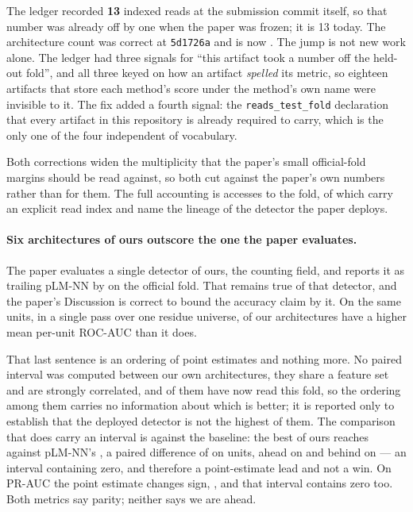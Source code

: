 The ledger recorded \textbf{13} indexed reads at the submission commit itself,
so that number was already off by one when the paper was frozen; it is 13 today.
The architecture count was correct at \texttt{5d1726a} and is now
\NArchOnFold{}. The jump is not new work alone. The ledger had three signals for
``this artifact took a number off the held-out fold'', and all three keyed on
how an artifact \emph{spelled} its metric, so eighteen artifacts that store each
method's score under the method's own name were invisible to it. The fix added a
fourth signal: the \texttt{reads\_test\_fold} declaration that every artifact in
this repository is already required to carry, which is the only one of the four
independent of vocabulary.

Both corrections widen the multiplicity that the paper's small official-fold
margins should be read against, so both cut against the paper's own numbers
rather than for them. The full accounting is \NFoldAccesses{} accesses to the
fold, of which \NIndexedReads{} carry an explicit read index and
\NLineageReads{} name the lineage of the detector the paper deploys.

\paragraph{Six architectures of ours outscore the one the paper evaluates.}
The paper evaluates a single detector of ours, the counting field, and reports
it as trailing pLM-NN by \PlmAucDelta{} \PlmAucCI{} on the official fold. That
remains true of that detector, and the paper's Discussion is correct to bound
the accuracy claim by it. On the same units, in a single pass over one residue
universe, \GrandNAboveTab{} of our \GrandNOurs{} architectures have a higher
mean per-unit ROC-AUC than it does.

That last sentence is an ordering of point estimates and nothing more. No
paired interval was computed between our own architectures, they share a feature
set and are strongly correlated, and \NArchOnFold{} of them have now read this
fold, so the ordering among them carries no information about which is better;
it is reported only to establish that the deployed detector is not the highest
of them. The comparison that does carry an interval is against the baseline:
the best of ours reaches \GrandBestRoc{} against pLM-NN's \GrandPlmRoc{}, a
paired difference of \GrandDPlmRoc{} \GrandDPlmRocCI{} on
\GrandDPlmRocNPaired{} units, ahead on \GrandDPlmRocWin{} and behind on
\GrandDPlmRocLoss{} --- an interval containing zero, and therefore a
point-estimate lead and not a win. On PR-AUC the point estimate changes sign,
\GrandDPlmPr{} \GrandDPlmPrCI{}, and that interval contains zero too. Both
metrics say parity; neither says we are ahead.

